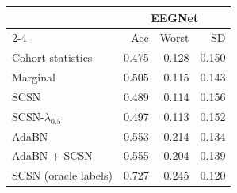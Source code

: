 \begin{tabular}{lrrr}
\toprule
 & \multicolumn{3}{c}{EEGNet} \\
\cmidrule(lr){2-4}
 & Acc & Worst & SD \\
\midrule
Cohort statistics & 0.475 & 0.128 & 0.150 \\
Marginal & 0.505 & 0.115 & 0.143 \\
SCSN & 0.489 & 0.114 & 0.156 \\
SCSN-$\lambda_{0.5}$ & 0.497 & 0.113 & 0.152 \\
AdaBN & 0.553 & 0.214 & 0.134 \\
AdaBN + SCSN & 0.555 & 0.204 & 0.139 \\
SCSN (oracle labels) & 0.727 & 0.245 & 0.120 \\
\bottomrule
\end{tabular}
